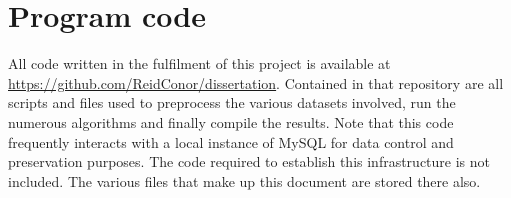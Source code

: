 %
%
%
%

\chapter{Program code}\label{C.Appendix2}
All code written in the fulfilment of this project is available at \url{https://github.com/ReidConor/dissertation}. Contained in that repository are all scripts and files used to preprocess the various datasets involved, run the numerous algorithms and finally compile the results. Note that this code frequently interacts with a local instance of MySQL for data control and preservation purposes. The code required to establish this infrastructure is not included. The various files that make up this document are stored there also.  